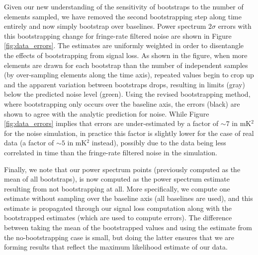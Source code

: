 \documentclass[preprint2,numberedappendix,tighten]{aastex6}  %
\begin{document}
Given our new understanding of the sensitivity of bootstraps to the number of elements sampled, we have removed the second 
bootstrapping step along time entirely and now simply bootstrap over baselines. Power spectrum $2\sigma$ errors with this bootstrapping change for fringe-rate filtered noise are shown in Figure 
\ref{fig:data_errors}. The estimates are uniformly weighted in order to disentangle the effects of bootstrapping from signal loss. As 
shown in the figure, when more elements are drawn for each bootstrap than the number of 
independent samples (by over-sampling elements along the time axis), repeated values begin to crop up and the apparent variation between bootstraps drops, resulting in limits (gray) below the predicted noise level (green). Using the revised bootstrapping method, where bootstrapping only occurs over the baseline axis, the errors (black) are shown to agree with the analytic prediction for noise. While Figure \ref{fig:data_errors} implies that errors are under-estimated by a factor of $\sim$$7$ in mK$^{2}$ for the noise simulation, in practice this factor is slightly lower for the case of real data (a factor of $\sim$$5$ in mK$^{2}$ instead), possibly due to the data being less correlated in time than the fringe-rate filtered noise in the simulation.

Finally, we note that our power spectrum points (previously computed as the mean of all bootstraps), is now computed as the power spectrum estimate resulting from not bootstrapping at all. More specifically, we compute one estimate without sampling over the baseline axis (all baselines are used), and this estimate is propagated through our signal loss computation along with the bootstrapped estimates (which are used to compute errors). The difference between taking the mean of the bootstrapped values and using the estimate from the no-bootstrapping case is small, but doing the latter ensures that we are forming results that reflect the maximum likelihood estimate of our data.
\end{document}

